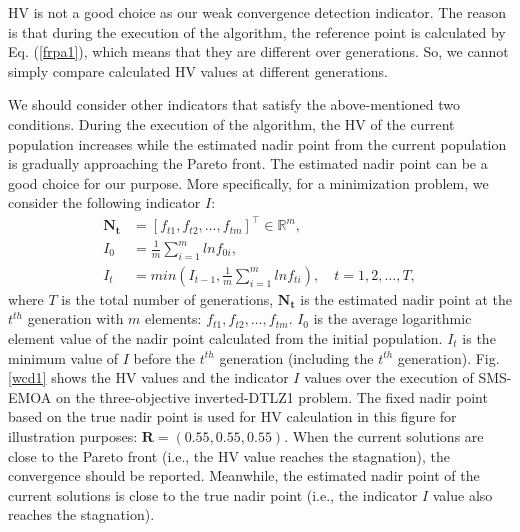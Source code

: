 \documentclass[conference]{IEEEtran}
\begin{document}
HV is not a good choice as our weak convergence detection indicator. 
The reason is that during the execution of the algorithm, the reference point is calculated by Eq. (\ref{frpa1}), 
which means that they are different over generations. 
So, we cannot simply compare calculated HV values at different generations. 

We should consider other indicators that satisfy the above-mentioned two conditions. 
During the execution of the algorithm, the HV of the current population increases 
while the estimated nadir point from the current population is gradually approaching the Pareto front. 
The estimated nadir point can be a good choice for our purpose. 
More specifically,
for a minimization problem, we consider the following indicator $I$:
\begin{equation}\begin{aligned}\label{ewcd1}
  \boldsymbol{N_{t}} &= [f_{t1},f_{t2},\dots,f_{tm}]^\top \in \mathbb{R}^m ,\\
  I_{0} &= \frac{1}{m} \sum_{i=1}^{m}lnf_{0i},\\
  I_{t} &= min(I_{t-1},\frac{1}{m} \sum_{i=1}^{m}lnf_{ti}), \quad
  t = 1,2,\dots,T,
\end{aligned}
\end{equation}
where $T$ is the total number of generations, 
$\boldsymbol{N_{t}}$ is the estimated nadir point at the $t^{th}$ generation with $m$ elements: $f_{t1},f_{t2},\dots,f_{tm}$. 
$I_0$ is the average logarithmic element value of the nadir point calculated from the initial population.
$I_t$ is the minimum value of $I$ before the $t^{th}$ generation (including the $t^{th}$ generation). 
Fig. \ref{wcd1} shows the HV values and the indicator $I$ values over the execution of SMS-EMOA 
on the three-objective inverted-DTLZ1 problem. 
The fixed nadir point based on the true nadir point is used for HV calculation in this figure for illustration purposes: $\boldsymbol R = (0.55, 0.55, 0.55)$.
When the current solutions are close to the Pareto front 
(i.e., the HV value reaches the stagnation), the convergence should be reported. 
Meanwhile, the estimated nadir point of the current solutions is close to the true nadir point 
(i.e., the indicator $I$ value also reaches the stagnation). 
 
\end{document}
